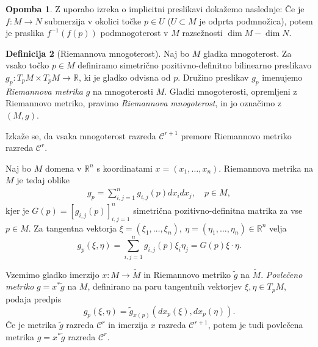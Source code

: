 \documentclass[12pt,a4paper,twoside]{article}
\theoremstyle{definition} %
\newtheorem{definicija}{Definicija}[section]
\newtheorem{opomba}[definicija]{Opomba}
\theoremstyle{plain} %
\numberwithin{equation}{section}  %
\newcommand{\R}{\mathbb R}
\begin{document}
\begin{opomba}
Z uporabo izreka o implicitni preslikavi dokažemo naslednje: Če je $f \colon M \to N$ submerzija v okolici točke $p \in U$ ($U \subset M$ je odprta podmnožica), potem je praslika $f^{-1}(f(p))$ podmnogoterost v $M$ razsežnosti $\dim M - \dim N$.
\end{opomba}

\begin{definicija} [Riemannova mnogoterost]
Naj bo $M$ gladka mnogoterost. Za vsako točko $p \in M$ definiramo simetrično pozitivno-definitno bilinearno preslikavo $g_{p} \colon T_{p}M \times T_{p}M \to \R$, ki je gladko odvisna od $p$. Družino preslikav $g_{p}$ imenujemo \emph{Riemannova metrika} $g$ na mnogoterosti $M$.
Gladki mnogoterosti, opremljeni z Riemannovo metriko, pravimo \emph{Riemannova mnogoterost}, in jo označimo z $(M,g)$.
\end{definicija}

Izkaže se, da vsaka mnogoterost razreda $\mathcal{C}^{r+1}$ premore Riemannovo metriko razreda $\mathcal{C}^{r}$.

Naj bo $M$ domena v $\R^{n}$ s koordinatami $x = (x_{1}, \dots, x_{n})$. Riemannova metrika na $M$ je tedaj oblike
\begin{gather}
g_{p} = \sum_{i,j=1}^{n} g_{i,j}(p) dx_{i} dx_{j}, \quad p \in M,
\end{gather}
kjer je $G(p) = [g_{i,j}(p)]_{i,j=1}^{n}$ simetrična pozitivno-definitna matrika za vse $p \in M$. Za tangentna vektorja $\xi = (\xi_{1}, \dots, \xi_{n}), \ \eta = (\eta_{1}, \dots, \eta_{n}) \in \R^{n}$ velja
\begin{equation}
g_{p}(\xi, \eta) = \sum_{i,j=1}^{n} g_{i,j}(p) \xi_{i} \eta_{j} = G(p) \xi \cdot \eta.
\end{equation}

Vzemimo gladko imerzijo $x \colon M \to \widetilde{M}$ in Riemannovo metriko $\tilde{g}$ na $\widetilde{M}$. \emph{Povlečeno metriko} $g = x^{*} \tilde{g}$ na $M$, definirano na paru tangentnih vektorjev $\xi, \eta \in T_{p}M$, podaja predpis
\begin{equation} \label{eq:pullback-metrika}
g_{p}(\xi, \eta) = \tilde{g}_{x(p)} (dx_{p}(\xi), dx_{p}(\eta)).
\end{equation}
Če je metrika $\tilde{g}$ razreda $\mathcal{C}^{r}$ in imerzija $x$ razreda $\mathcal{C}^{r+1}$, potem je tudi povlečena metrika $g = x^{*} \tilde{g}$ razreda $\mathcal{C}^{r}$.
\end{document}
